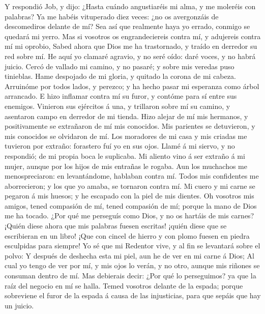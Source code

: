  Y respondió Job, y dijo:  ¿Hasta cuándo
angustiaréis mi alma, y me moleréis con palabras?  Ya me
habéis vituperado diez veces: ¿no os avergonzáis de descomediros delante
de mí?  Sea así que realmente haya yo errado, conmigo se
quedará mi yerro.  Mas si vosotros os engrandeciereis contra
mí, y adujereis contra mí mi oprobio,  Sabed ahora que Dios
me ha trastornado, y traído en derredor su red sobre mí.  He
aquí yo clamaré agravio, y no seré oído: daré voces, y no habrá juicio.
 Cercó de vallado mi camino, y no pasaré; y sobre mis
veredas puso tinieblas.  Hame despojado de mi gloria, y
quitado la corona de mi cabeza.  Arruinóme por todos lados,
y perezco; y ha hecho pasar mi esperanza como árbol arrancado.
 E hizo inflamar contra mí su furor, y contóme para sí
entre sus enemigos.  Vinieron sus ejércitos á una, y
trillaron sobre mí su camino, y asentaron campo en derredor de mi
tienda.  Hizo alejar de mí mis hermanos, y positivamente se
extrañaron de mí mis conocidos.  Mis parientes se
detuvieron, y mis conocidos se olvidaron de mí.  Los
moradores de mi casa y mis criadas me tuvieron por extraño: forastero
fuí yo en sus ojos.  Llamé á mi siervo, y no respondió; de
mi propia boca le suplicaba.  Mi aliento vino á ser extraño
á mi mujer, aunque por los hijos de mis entrañas le rogaba.
 Aun los muchachos me menospreciaron: en levantándome,
hablaban contra mí.  Todos mis confidentes me aborrecieron;
y los que yo amaba, se tornaron contra mí.  Mi cuero y mi
carne se pegaron á mis huesos; y he escapado con la piel de mis dientes.
 Oh vosotros mis amigos, tened compasión de mí, tened
compasión de mí; porque la mano de Dios me ha tocado.  ¿Por
qué me perseguís como Dios, y no os hartáis de mis carnes? 
¡Quién diese ahora que mis palabras fuesen escritas! ¡quién diese que se
escribieran en un libro!  ¡Que con cincel de hierro y con
plomo fuesen en piedra esculpidas para siempre!  Yo sé que
mi Redentor vive, y al fin se levantará sobre el polvo:  Y
después de deshecha esta mi piel, aun he de ver en mi carne á Dios;
 Al cual yo tengo de ver por mí, y mis ojos lo verán, y no
otro, aunque mis riñones se consuman dentro de mí.  Mas
debierais decir: ¿Por qué lo perseguimos? ya que la raíz del negocio en
mí se halla.  Temed vosotros delante de la espada; porque
sobreviene el furor de la espada á causa de las injusticias, para que
sepáis que hay un juicio.

